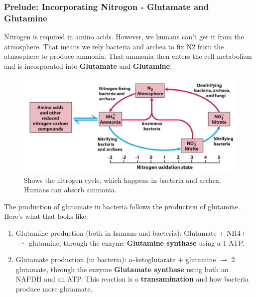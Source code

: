 \documentclass[../main.tex]{subfiles}
\begin{document}
\subsubsection{Prelude: Incorporating Nitrogon - Glutamate and Glutamine}

Nitrogen is required in amino acids. However, we humans can't get it from the atmosphere. That means we rely bacteria and archea to fix N2 from the atmosphere to produce ammonia. That ammonia then enters the cell metabolism and is incorporated into \textbf{\gls{Glutamate}} and \textbf{\gls{Glutamine}}.

\begin{figure}[H]
	\centering
	\includegraphics[width=0.6\linewidth]{nit_cyc}
	\caption{Shows the nitrogen cycle, which happens in bacteria and archea. Humans can absorb ammonia.}
	\label{fig:nitcyc}
\end{figure}

The production of glutamate in bacteria follows the production of glutamine. Here's what that looks like:
\begin{enumerate}
	\item Glutamine production (both in humans and bacteria): Glutamate + NH4+ $\rightharpoonup$ glutamine, through the enzyme \textbf{\gls{Glutamine synthase}} using a 1 ATP.
	\item Glutamate production (in bacteria): $\alpha$-ketoglutarate + glutamine $\rightharpoonup$ 2 glutamate, through the enzyme \textbf{\gls{Glutamate synthase}} using both an NAPDH and an ATP. This reaction is a \textbf{transamination} and how bacteria produce more glutamate.
\end{enumerate}
\end{document}
